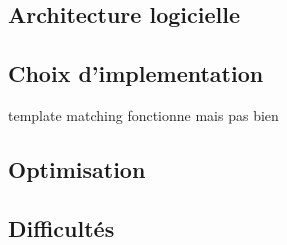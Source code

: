 \subsection{Architecture logicielle}

\subsection{Choix d'implementation}
template matching fonctionne mais pas bien

\subsection{Optimisation}

\subsection{Difficultés}